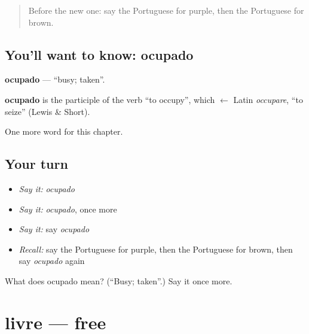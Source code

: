 \label{lesson:PT-C121-ocupado}



\begin{quote}
Before the new one: say the Portuguese for purple, then the Portuguese for brown.
\end{quote}

\subsection*{You'll want to know: ocupado}
\textbf{ocupado} — \textquotedblleft{}busy; taken\textquotedblright{}.

\begin{cousinweb}
\textbf{ocupado} is the participle of the verb \textquotedblleft{}to occupy\textquotedblright{}, which $\leftarrow$ Latin \emph{occupare}, \textquotedblleft{}to seize\textquotedblright{} (Lewis \& Short).
\end{cousinweb}

\begin{grammarlens}[title={What you've built}]
One more word for this chapter.
\end{grammarlens}

\subsection*{Your turn}
\begin{itemize}
\raggedright
  \item \emph{Say it:} \emph{ocupado}
  \item \emph{Say it:} \emph{ocupado}, once more
  \item \emph{Say it:} say \emph{ocupado}
  \item \emph{Recall:} say the Portuguese for purple, then the Portuguese for brown, then say \emph{ocupado} again
\end{itemize}

\begin{tcolorbox}[breakable,colback=teal!4,colframe=teal!35!black,title={Before you move on}]
What does ocupado mean? (\textquotedblleft{}Busy; taken\textquotedblright{}.) Say it once more.
\end{tcolorbox}
\section[livre]{livre — free}

\label{lesson:PT-C121-livre}



